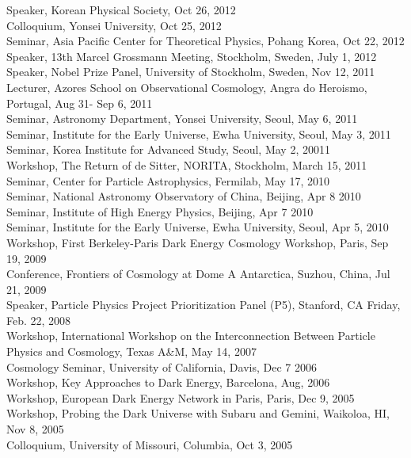 \documentclass[line, margin]{res}
\begin{document}
\begin{resume}
Speaker, Korean Physical Society, Oct 26, 2012\\
Colloquium, Yonsei University, Oct 25, 2012\\
Seminar, Asia Pacific Center for Theoretical Physics, Pohang Korea, Oct 22, 2012\\
Speaker, 13th Marcel Grossmann Meeting, Stockholm, Sweden, July 1, 2012\\ 
Speaker, Nobel Prize Panel, University of Stockholm, Sweden, Nov 12, 2011\\
Lecturer, Azores School on Observational Cosmology, Angra do Heroismo, Portugal, Aug 31- Sep 6, 2011\\
Seminar, Astronomy Department, Yonsei University, Seoul, May 6, 2011\\
Seminar, Institute for the Early Universe, Ewha University, Seoul, May 3, 2011\\
Seminar, Korea Institute for Advanced Study, Seoul, May 2, 20011\\
Workshop, The Return of de Sitter, NORITA, Stockholm, March 15, 2011\\
Seminar, Center for Particle Astrophysics, Fermilab, May 17, 2010\\
Seminar, National Astronomy Observatory of China, Beijing, Apr 8 2010\\
Seminar, Institute of High Energy Physics, Beijing, Apr 7 2010\\
Seminar, Institute for the Early Universe, Ewha University, Seoul, Apr 5, 2010\\
Workshop, First Berkeley-Paris Dark Energy Cosmology Workshop, Paris, Sep 19, 2009\\
Conference, Frontiers of Cosmology at Dome A Antarctica, Suzhou, China, Jul 21, 2009\\
Speaker, Particle Physics Project Prioritization Panel (P5), Stanford, CA Friday, Feb. 22, 2008\\
Workshop, International Workshop on the Interconnection Between
Particle Physics and Cosmology, Texas A\&M, May 14, 2007 \\
Cosmology Seminar, University of California, Davis, Dec 7 2006\\
Workshop, Key Approaches to Dark Energy, Barcelona,  Aug, 2006\\
Workshop, European Dark Energy Network in Paris, Paris, Dec 9, 2005 \\
Workshop, Probing the Dark Universe with Subaru and Gemini, Waikoloa, HI, Nov 8, 2005\\
Colloquium, University of Missouri, Columbia, Oct 3, 2005\\

\end{resume}
\end{document}
